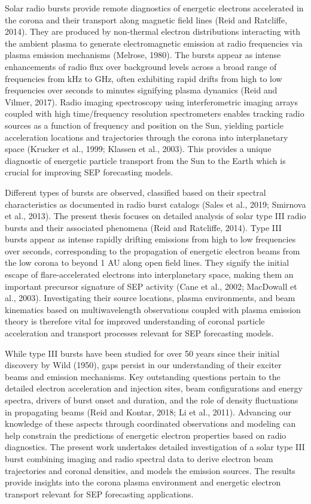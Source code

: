 \documentclass{article}
\begin{document}
Solar radio bursts provide remote diagnostics of energetic electrons accelerated in the corona and their transport along magnetic field lines (Reid and Ratcliffe, 2014). They are produced by non-thermal electron distributions interacting with the ambient plasma to generate electromagnetic emission at radio frequencies via plasma emission mechanisms (Melrose, 1980). The bursts appear as intense enhancements of radio flux over background levels across a broad range of frequencies from kHz to GHz, often exhibiting rapid drifts from high to low frequencies over seconds to minutes signifying plasma dynamics (Reid and Vilmer, 2017). Radio imaging spectroscopy using interferometric imaging arrays coupled with high time/frequency resolution spectrometers enables tracking radio sources as a function of frequency and position on the Sun, yielding particle acceleration locations and trajectories through the corona into interplanetary space (Krucker et al., 1999; Klassen et al., 2003). This provides a unique diagnostic of energetic particle transport from the Sun to the Earth which is crucial for improving SEP forecasting models.

Different types of bursts are observed, classified based on their spectral characteristics as documented in radio burst catalogs (Sales et al., 2019; Smirnova et al., 2013). The present thesis focuses on detailed analysis of solar type III radio bursts and their associated phenomena (Reid and Ratcliffe, 2014). Type III bursts appear as intense rapidly drifting emissions from high to low frequencies over seconds, corresponding to the propagation of energetic electron beams from the low corona to beyond 1 AU along open field lines. They signify the initial escape of flare-accelerated electrons into interplanetary space, making them an important precursor signature of SEP activity (Cane et al., 2002; MacDowall et al., 2003). Investigating their source locations, plasma environments, and beam kinematics based on multiwavelength observations coupled with plasma emission theory is therefore vital for improved understanding of coronal particle acceleration and transport processes relevant for SEP forecasting models.

While type III bursts have been studied for over 50 years since their initial discovery by Wild (1950), gaps persist in our understanding of their exciter beams and emission mechanisms. Key outstanding questions pertain to the detailed electron acceleration and injection sites, beam configurations and energy spectra, drivers of burst onset and duration, and the role of density fluctuations in propagating beams (Reid and Kontar, 2018; Li et al., 2011). Advancing our knowledge of these aspects through coordinated observations and modeling can help constrain the predictions of energetic electron properties based on radio diagnostics. The present work undertakes detailed investigation of a solar type III burst combining imaging and radio spectral data to derive electron beam trajectories and coronal densities, and models the emission sources. The results provide insights into the corona plasma environment and energetic electron transport relevant for SEP forecasting applications.
\end{document}
